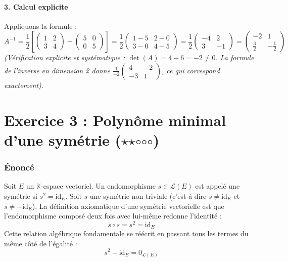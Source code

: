 \documentclass[11pt,a4paper]{article}
\begin{document}
\subsection{3. Calcul explicite}
Appliquons la formule :
$$A^{-1} = \frac{1}{2} \left[ \begin{pmatrix} 1 & 2 \\ 3 & 4 \end{pmatrix} - \begin{pmatrix} 5 & 0 \\ 0 & 5 \end{pmatrix} \right] = \frac{1}{2} \begin{pmatrix} 1 - 5 & 2 - 0 \\ 3 - 0 & 4 - 5 \end{pmatrix} = \frac{1}{2} \begin{pmatrix} -4 & 2 \\ 3 & -1 \end{pmatrix} = \begin{pmatrix} -2 & 1 \\ \frac{3}{2} & -\frac{1}{2} \end{pmatrix}$$
\textit{(Vérification explicite et systématique : $\det(A) = 4 - 6 = -2 \neq 0$. La formule de l'inverse en dimension 2 donne $\frac{1}{-2} \begin{pmatrix} 4 & -2 \\ -3 & 1 \end{pmatrix}$, ce qui correspond exactement).}




\part{Exercice 3 : Polynôme minimal d'une symétrie ($\star$$\star$$\circ$$\circ$$\circ$)}

\section{Énoncé}

Soit $E$ un $\mathbb{K}$-espace vectoriel. Un endomorphisme $s \in \mathcal{L}(E)$ est appelé une symétrie si $s^2 = \text{id}_E$.
Soit $s$ une symétrie non triviale (c'est-à-dire $s \neq \text{id}_E$ et $s \neq -\text{id}_E$).
La définition axiomatique d'une symétrie vectorielle est que l'endomorphisme composé deux fois avec lui-même redonne l'identité :
$$ s \circ s = s^2 = \text{id}_E $$
Cette relation algébrique fondamentale se réécrit en passant tous les termes du même côté de l'égalité :
$$ s^2 - \text{id}_E = 0_{\mathcal{L}(E)} $$
\end{document}
